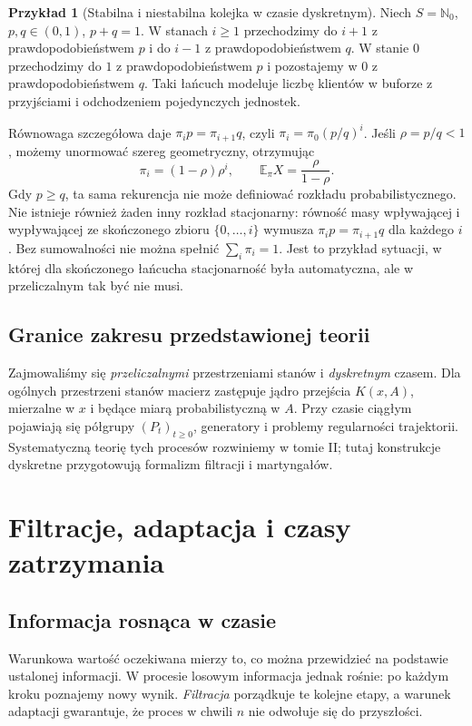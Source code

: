 \documentclass[11pt,a4paper,oneside]{report}
\numberwithin{equation}{chapter}
\theoremstyle{plain}
\theoremstyle{definition}
\newtheorem{przyklad}{Przykład}[chapter]
\theoremstyle{remark}
\newcommand{\N}{\mathbb{N}}
\newcommand{\E}{\mathbb{E}}
\begin{document}
\begin{przyklad}[Stabilna i niestabilna kolejka w czasie dyskretnym]
Niech $S=\N_0$, $p,q\in(0,1)$, $p+q=1$.
W stanach $i\geq1$ przechodzimy do $i+1$
z prawdopodobieństwem $p$ i do $i-1$
z prawdopodobieństwem $q$.
W stanie $0$ przechodzimy do $1$ z
prawdopodobieństwem $p$ i pozostajemy w $0$
z prawdopodobieństwem $q$. Taki łańcuch
modeluje liczbę klientów w buforze z przyjściami
i odchodzeniem pojedynczych jednostek.

Równowaga szczegółowa daje
$\pi_i p=\pi_{i+1}q$, czyli
$\pi_i=\pi_0(p/q)^i$. Jeśli $\rho=p/q<1$,
możemy unormować szereg geometryczny,
otrzymując
\[
\pi_i=(1-\rho)\rho^i,
\qquad \E_\pi X=\frac{\rho}{1-\rho}.
\]
Gdy $p\geq q$, ta sama rekurencja nie może
definiować rozkładu probabilistycznego.
Nie istnieje również żaden inny rozkład
stacjonarny: równość masy wpływającej i
wypływającej ze skończonego zbioru
$\{0,\ldots,i\}$ wymusza
$\pi_i p=\pi_{i+1}q$ dla każdego $i$.
Bez sumowalności nie można spełnić
$\sum_i\pi_i=1$. Jest to przykład sytuacji,
w której dla skończonego łańcucha stacjonarność
była automatyczna, ale w przeliczalnym
tak być nie musi.
\end{przyklad}


\section{Granice zakresu przedstawionej teorii}

Zajmowaliśmy się \emph{przeliczalnymi} przestrzeniami
stanów i \emph{dyskretnym} czasem. Dla ogólnych
przestrzeni stanów macierz zastępuje jądro
przejścia $K(x,A)$, mierzalne w $x$ i będące
miarą probabilistyczną w $A$. Przy czasie ciągłym
pojawiają się półgrupy $(P_t)_{t\geq0}$,
generatory i problemy regularności trajektorii.
Systematyczną teorię tych procesów rozwiniemy
w tomie II; tutaj konstrukcje dyskretne
przygotowują formalizm filtracji i martyngałów.


\chapter{Filtracje, adaptacja i czasy zatrzymania}
\label{ch:filtracje}

\section{Informacja rosnąca w czasie}

Warunkowa wartość oczekiwana mierzy to, co można
przewidzieć na podstawie ustalonej informacji.
W procesie losowym informacja jednak rośnie:
po każdym kroku poznajemy nowy wynik. \emph{Filtracja}
porządkuje te kolejne etapy, a warunek adaptacji
gwarantuje, że proces w chwili $n$ nie odwołuje się
do przyszłości.
\end{document}
